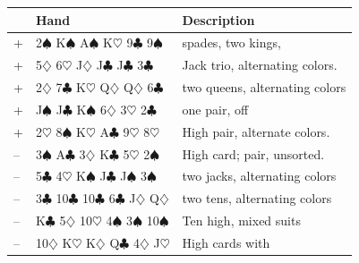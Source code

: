 \documentclass[11pt,a4paper]{article}
\begin{document}
\begin{longtable}{C{0.5cm} L{5cm} L{8cm}}
\toprule
& \textbf{Hand} & \textbf{Description} \\
\midrule
\endfirsthead
\midrule
\endhead
{} + & 2$\spadesuit$ K$\spadesuit$ A$\spadesuit$ K$\heartsuit$ 9$\clubsuit$ 9$\spadesuit$ & spades, two kings, \\
 + & 5$\diamondsuit$ 6$\heartsuit$ J$\diamondsuit$ J$\clubsuit$ J$\clubsuit$ 3$\clubsuit$ & Jack trio, alternating colors. \\
 + & 2$\diamondsuit$ 7$\clubsuit$ K$\heartsuit$ Q$\diamondsuit$ Q$\diamondsuit$ 6$\clubsuit$ & two queens, alternating colors \\
 + & J$\spadesuit$ J$\clubsuit$ K$\spadesuit$ 6$\diamondsuit$ 3$\heartsuit$ 2$\clubsuit$ & one pair, off \\
 + & 2$\heartsuit$ 8$\spadesuit$ K$\heartsuit$ A$\clubsuit$ 9$\heartsuit$ 8$\heartsuit$ & High pair, alternate colors. \\
 -- & 3$\spadesuit$ A$\clubsuit$ 3$\diamondsuit$ K$\clubsuit$ 5$\heartsuit$ 2$\spadesuit$ & High card; pair, unsorted. \\
 -- & 5$\clubsuit$ 4$\heartsuit$ K$\spadesuit$ J$\clubsuit$ J$\spadesuit$ 3$\spadesuit$ & two jacks, alternating colors \\
 -- & 3$\clubsuit$ 10$\clubsuit$ 10$\clubsuit$ 6$\clubsuit$ J$\diamondsuit$ Q$\diamondsuit$ & two tens, alternating colors \\
 -- & K$\clubsuit$ 5$\diamondsuit$ 10$\heartsuit$ 4$\spadesuit$ 3$\spadesuit$ 10$\spadesuit$ & Ten high, mixed suits \\
 -- & 10$\diamondsuit$ K$\heartsuit$ K$\diamondsuit$ Q$\clubsuit$ 4$\diamondsuit$ J$\heartsuit$ & High cards with \\
\bottomrule
\end{longtable}
\end{document}
